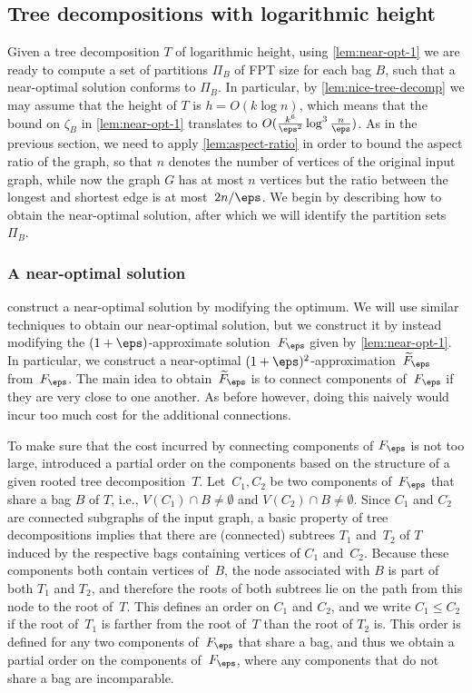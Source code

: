 \subsection{Tree decompositions with logarithmic height}
\label{sec:tw-log-height}

Given a tree decomposition $T$ of logarithmic height, using \autoref{lem:near-opt-1} we are ready to compute a set of partitions $\Pi_B$ of FPT size for each bag $B$, such that a near-optimal solution conforms to $\Pi_B$. In particular, by \autoref{lem:nice-tree-decomp} we may assume that the height of $T$ is $h=O(k\log n)$, which means that the bound on $\zeta_B$ in \autoref{lem:near-opt-1} translates to $O(\frac{k^6}{\eps^2}\log^3\frac{n}{\eps})$.
As in the previous section, we need to apply \autoref{lem:aspect-ratio} in order to bound the aspect ratio of the graph, so that $n$ denotes the number of vertices of the original input graph, while now the graph $G$ has at most $n$ vertices but the ratio between the longest and shortest edge is at most~$2n/\eps$.
We begin by describing how to obtain the near-optimal solution, after which we will identify the partition sets~$\Pi_B$.

\subsubsection{A near-optimal solution}
\label{sec:approx-sol}

\citet{bateni2011approximation} construct a near-optimal solution by modifying the optimum. 
We will use similar techniques to obtain our near-optimal solution, but we construct it by instead modifying the $(1+\eps)$-approx\-imate solution~$F_\eps$ given by \autoref{lem:near-opt-1}.
In particular, we construct a near-optimal $(1+\eps)^2$-approximation~$\widetilde{F}_\eps$ from~$F_\eps$.
The main idea to obtain~$\widetilde{F}_\eps$ is to connect components of~$F_\eps$ if they are very close to one another. 
As before however, doing this naively would incur too much cost for the additional connections.

To make sure that the cost incurred by connecting components of $F_\eps$ is not too large, 
\cite{bateni2011approximation} introduced a partial order on the components based on the structure of a given rooted tree decomposition~$T$.
Let~$C_1,C_2$ be two components of~$F_\eps$ that share a bag $B$ of $T$, i.e.,
$V(C_1)\cap B\neq\emptyset$ and $V(C_2)\cap B\neq\emptyset$.  Since $C_1$ and
$C_2$ are connected subgraphs of the input graph, a basic property of tree
decompositions implies that there are (connected) subtrees $T_1$ and~$T_2$ of
$T$ induced by the respective bags containing vertices of $C_1$ and~$C_2$.
Because these components both contain vertices of~$B$, the node associated with
$B$ is part of both $T_1$ and $T_2$, and therefore the roots of both subtrees
lie on the path from this node to the root of~$T$.  This defines an order on
$C_1$ and $C_2$, and we write $C_1\leq C_2$ if the root of~$T_1$ is farther
from the root of~$T$ than the root of $T_2$ is.  This order is defined for any
two components of~$F_\eps$ that share a bag, and thus we obtain a partial order
on the components of~$F_\eps$, where any components that do not share a bag are
incomparable. 

